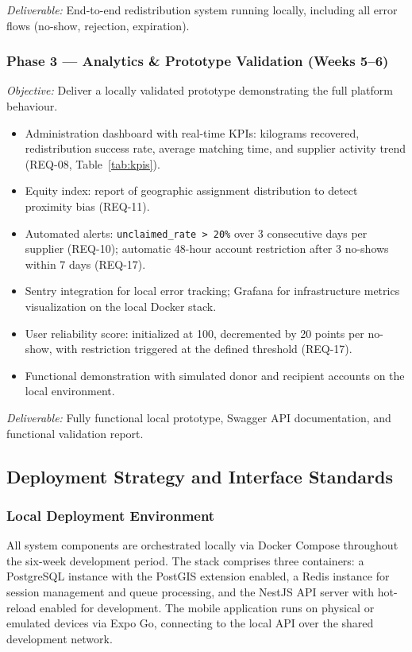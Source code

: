\documentclass[conference]{IEEEtran}
\begin{document}
\textit{Deliverable:} End-to-end redistribution system running locally, including all error flows (no-show, rejection, expiration).

\subsubsection{Phase 3 — Analytics \& Prototype Validation (Weeks 5–6)}

\textit{Objective:} Deliver a locally validated prototype demonstrating the full platform behaviour.

\begin{itemize}
  \item Administration dashboard with real-time KPIs: kilograms recovered, redistribution success rate, average matching time, and supplier activity trend (REQ-08, Table~\ref{tab:kpis}).
  \item Equity index: report of geographic assignment distribution to detect proximity bias (REQ-11).
  \item Automated alerts: \texttt{unclaimed\_rate > 20\%} over 3 consecutive days per supplier (REQ-10); automatic 48-hour account restriction after 3 no-shows within 7 days (REQ-17).
  \item Sentry integration for local error tracking; Grafana for infrastructure metrics visualization on the local Docker stack.
  \item User reliability score: initialized at 100, decremented by 20 points per no-show, with restriction triggered at the defined threshold (REQ-17).
  \item Functional demonstration with simulated donor and recipient accounts on the local environment.
\end{itemize}

\textit{Deliverable:} Fully functional local prototype, Swagger API documentation, and functional validation report.

\subsection{Deployment Strategy and Interface Standards}

\subsubsection{Local Deployment Environment}

All system components are orchestrated locally via Docker Compose throughout the six-week development period. The stack comprises three containers: a PostgreSQL instance with the PostGIS extension enabled, a Redis instance for session management and queue processing, and the NestJS API server with hot-reload enabled for development. The mobile application runs on physical or emulated devices via Expo Go, connecting to the local API over the shared development network.
\end{document}
